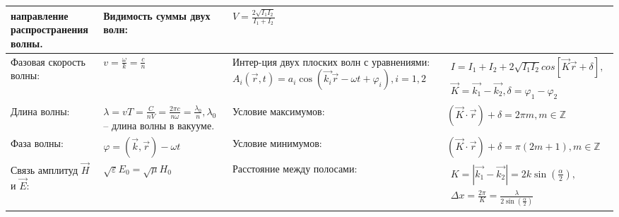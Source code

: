 \documentclass{article}
\begin{document}
\begin{tabular}{ |p{4.1cm}|p{5.4cm}|p{3.9cm}|p{5.6cm}|  }
 направление распространения волны.                                          &  %
Видимость суммы двух волн:                                                   &  %
$V = \frac{2 \sqrt{I_1 I_2}}{I_1 + I_2}$                                     \\ %
\hline
Фазовая скорость волны:                                                      &  %
$v = \frac{\omega}{k} = \frac{c}{n}$                                         &  %
Интер-ция двух плоских волн с уравнениями:
$A_i(\vec{r}, t) = a_i \cos(\vec{k_i}\vec{r} - \omega t + \varphi_i),
 i = 1, 2$                                                                   &  %
$\begin{aligned}
I = I_1 + I_2 + 2 \sqrt{I_1 I_2} cos [\vec{K} \vec{r} + \delta],  \\
\vec{K} = \vec{k_1} - \vec{k_2}, \delta = \varphi_1 - \varphi_2
\end{aligned}$                                                               \\ %
\hline
Длина волны:                                                                 &  %
$\lambda = vT = \frac{C}{nV} = \frac{2 \pi c}{n \omega} =
 \frac{\lambda_0}{n}, \lambda_0$ -- длина волны в вакууме.                   &  %
Условие максимумов:                                                          &  %
$(\vec{K} \cdot \vec{r}) + \delta = 2 \pi m, m \in \mathbb{Z}$                          \\ %
\hline
Фаза волны:                                                                  &  %
$\varphi = (\vec{k}, \vec{r}) - \omega t$                                    &  %
Условие минимумов:                                                           &  %
$(\vec{K} \cdot \vec{r}) + \delta = \pi (2 m + 1), m \in \mathbb{Z}$         \\ %
\hline
Связь амплитуд $\vec{H}$ и $\vec{E}$:                                        &  %
$\sqrt{\varepsilon} E_0 = \sqrt{\mu} H_0$                                    &  %
Расстояние между полосами:                                                   &  %
$\begin{aligned}
K = |\vec{k_1} - \vec{k_2}| = 2k\sin(\frac{\alpha}{2}),  \\
\Delta x = \frac{2 \pi}{K} = \frac{\lambda}{2 \sin(\frac{\alpha}{2})}
\end{aligned}$                                                               \\ %

\end{tabular}
\end{document}
